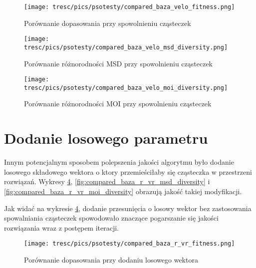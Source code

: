 \begin{figure}[H]
\begin{center} 
\texttt{[image: tresc/pics/psotesty/compared\_baza\_velo\_fitness.png]}
\caption{Porównanie dopasowania przy spowolnieniu cząsteczek}
\label{fig:compared_baza_velo_fitness}
\end{center}
\end{figure}

\begin{figure}[H]
\begin{center} 
\texttt{[image: tresc/pics/psotesty/compared\_baza\_velo\_msd\_diversity.png]}
\caption{Porównanie różnorodności MSD przy spowolnieniu cząsteczek}
\label{fig:compared_baza_velo_msd_diversity}
\end{center}
\end{figure}

\begin{figure}[H]
\begin{center} 
\texttt{[image: tresc/pics/psotesty/compared\_baza\_velo\_moi\_diversity.png]}
\caption{Porównanie różnorodności MOI przy spowolnieniu cząsteczek}
\label{fig:compared_baza_velo_moi_diversity}
\end{center}
\end{figure}




\section{Dodanie losowego parametru}

Innym potencjalnym sposobem polepszenia jakości algorytmu było dodanie losowego składowego wektora o ktory przemieściłaby się cząsteczka w przestrzeni rozwiązań. Wykresy \ref{fig:compared_baza_r_vr_fitness}, \ref{fig:compared_baza_r_vr_msd_diversity} i \ref{fig:compared_baza_r_vr_moi_diversity} obrazują jakość takiej modyfikacji. 

Jak widać na wykresie \ref{fig:compared_baza_r_vr_fitness}, dodanie przesunięcia o losowy wektor bez zastosowania spowalniania cząsteczek spowodowało znaczące pogarszanie się jakości rozwiązania wraz z postępem iteracji.

\clearpage

\begin{figure}[H]
\begin{center} 
\texttt{[image: tresc/pics/psotesty/compared\_baza\_r\_vr\_fitness.png]}
\caption{Porównanie dopasowania przy dodaniu losowego wektora}
\label{fig:compared_baza_r_vr_fitness}
\end{center}
\end{figure}

